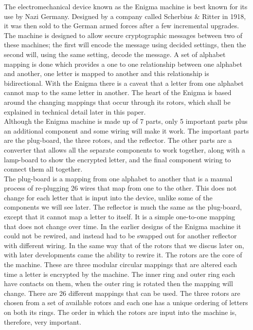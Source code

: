 \documentclass[12pt,a4paper]{article}
\begin{document}
The electromechanical device known as the Enigma machine is best known for its use by Nazi Germany. Designed by a company called Scherbius \& Ritter in 1918, it was then sold to the German armed forces after a few incremental upgrades. The machine is designed to allow secure cryptographic messages between two of these machines; the first will encode the message using decided settings, then the second will, using the same setting, decode the message. A set of alphabet mapping is done which provides a one to one relationship between one alphabet and another, one letter is mapped to another and this relationship is bidirectional. With the Enigma there is a caveat that a letter from one alphabet cannot map to the same letter in another. The heart of the Enigma is based around the changing mappings that occur through its rotors, which shall be explained in technical detail later in this paper.\\

Although the Enigma machine is made up of 7 parts, only 5 important parts plus an additional component and some wiring will make it work. The important parts are the plug-board, the three rotors, and the reflector. The other parts are a converter that allows all the separate components to work together, along with a lamp-board to show the encrypted letter, and the final component wiring to connect them all together.\\

The plug-board is a mapping from one alphabet to another that is a manual process of re-plugging 26 wires that map from one to the other. This does not change for each letter that is input into the device, unlike some of the components we will see later. The reflector is much the same as the plug-board, except that it cannot map a letter to itself. It is a simple one-to-one mapping that does not change over time. In the earlier designs of the Enigma machine it could not be rewired, and instead had to be swapped out for another reflector with different wiring. In the same way that of the rotors that we discus later on, with later developments came the ability to rewire it. The rotors are the core of the machine. These are three modular circular mappings that are altered each time a letter is encrypted by the machine. The inner ring and outer ring each have contacts on them, when the outer ring is rotated then the mapping will change. There are 26 different mappings that can be used. The three rotors are chosen from a set of available rotors and each one has a unique ordering of letters on both its rings. The order in which the rotors are input into the machine is, therefore, very important.\\
\end{document}
